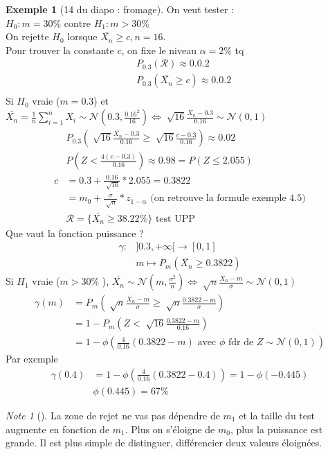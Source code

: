 \documentclass{article}
\theoremstyle{plain}%
\theoremstyle{definition}
\newtheorem{exmp}{Exemple}[section]
\theoremstyle{remark}
\newtheorem*{note}{Note}
\begin{document}
\begin{exmp}[14 du diapo : fromage]
    On veut tester : $ H_0: m=30\% \text{ contre } H_1: m > 30\% $ \\
    On rejette $ H_0 $ lorsque $ \bar{X_n} \geq c, n = 16 $. \\
    Pour trouver la constante $ c $, on fixe le niveau $ \alpha = 2\% $ tq 
    \begin{align*}
        & P_{0.3} (\mathcal{R}) \approx 0.0.2  \\
        & P_{0.3} (\bar{X_n} \geq c) \approx 0.0.2  \\
    \end{align*}
    Si $ H_0 $ vraie ($m=0.3$) et $ \bar{X_n} = \frac{1}{n}\sum_{i=1}^{n}X_i \sim \mathcal{N}(0.3, \frac{0.16^2}{16}) \Leftrightarrow \sqrt[]{16}\frac{\bar{X_n} - 0.3}{0.16} \sim \mathcal{N}(0,1)$ 
    \begin{align*}
        &P_{0.3} ( \sqrt[]{16} \frac{\bar{X_n} - 0.3}{0.16} \geq \sqrt[]{16} \frac{c - 0.3}{0.16}) \approx 0.02 \\
        &P(Z < \frac{4(c-0.3)}{0.16}) \approx 0.98 = P(Z \leq 2.055) \\
        c &= 0.3 + \frac{0.16}{\sqrt[]{16}} * 2.055 = 0.3822 \\
        &= m_0 + \frac{\sigma }{\sqrt[]{n}} * z_{1-\alpha} \text{ (on retrouve la formule exemple 4.5)} \\
        & \mathcal{R}= \{\bar{X_n} \geq 38.22\%\} \text{ test UPP }
    \end{align*}
    Que vaut la fonction puissance ? 
    \begin{align*}
        \gamma :& ]0.3, + \infty [ \to [0,1] \\
                & m \mapsto P_m (\bar{X_n} \geq 0.3822)
    \end{align*}
    Si $ H_1 $ vraie ($ m > 30\% $ ), $ \bar{X_n} \sim \mathcal{N}(m, \frac{\sigma ^2}{n}) \Leftrightarrow \sqrt[]{n} \frac{\bar{X_n} - m}{\sigma } \sim \mathcal{N} (0,1)$ 
    \begin{align*}
        \gamma (m) &= P_m (\sqrt[]{n} \frac{\bar{X_n} - m}{\sigma } \geq \sqrt[]{n} \frac{0.3822 - m}{\sigma }) \\
                    &= 1 - P_m (Z < \sqrt[]{16} \frac{0.3822 - m}{0.16}) \\
                    &= 1 - \phi (\frac{4}{0.16} (0.3822 - m) \text{ avec } \phi \text{ fdr de } Z \sim \mathcal{N}(0,1))
    \end{align*}
    Par exemple 
    \begin{align*}
        \gamma (0.4) &= 1 - \phi (\frac{4}{0.16} (0.3822 - 0.4)) = 1 - \phi (-0.445) \\
                    & \phi (0.445) = 67\%
    \end{align*}

    \begin{note}[]
        La zone de rejet ne vas pas dépendre de $ m_1 $ et la taille du test augmente en fonction de $ m_1 $. Plus on s'éloigne de $ m_0 $, plus la puissance est grande. Il est plus simple de distinguer, différencier deux valeurs éloignées.
    \end{note}
\end{exmp}
\end{document}
